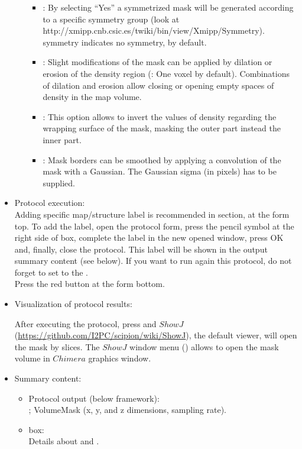 \begin{itemize}
\begin{itemize}
\begin{itemize}
     \item {}: By selecting ``Yes'' a symmetrized mask will be generated according to a specific symmetry group (look at http://xmipp.cnb.csic.es/twiki/bin/view/Xmipp/Symmetry).  symmetry indicates no symmetry, by default.
     \item {}: Slight modifications of the mask can be applied by dilation or erosion of the density region (: One voxel by default). Combinations of dilation and erosion allow closing or opening empty spaces of density in the map volume.
     \item {}: This option allows to invert the values of density regarding the wrapping surface of the mask, masking the outer part instead the inner part.
     \item {}: Mask borders can be smoothed by applying a convolution of the mask with a Gaussian. The Gaussian sigma (in pixels) has to be supplied.
     \end{itemize}

    \end{itemize}
 
 \item Protocol execution:\\
 Adding specific map/structure label is recommended in  section, at the form top. To add the label, open the protocol form, press the pencil symbol at the right side of  box, complete the label in the new opened window, press OK and, finally, close the protocol. This label will be shown in the output summary content (see below). If you want to run again this protocol, do not forget to set to  the .\\
  Press the  red button at the form bottom.
  
  \item Visualization of protocol results:
  
  After executing the protocol, press  and $ShowJ$ (\url{https://github.com/I2PC/scipion/wiki/ShowJ}), the default \scipion viewer, will open the mask by slices. The $ShowJ$ window menu () allows to open the mask volume in $Chimera$ graphics window.

 \item Summary content:
  \begin{itemize}
     \item Protocol output (below \scipion framework):\\ ; VolumeMask (x, y, and z dimensions, sampling rate).
     \item {} box:\\ Details about  and .
    \end{itemize}
    
 \end{itemize}
